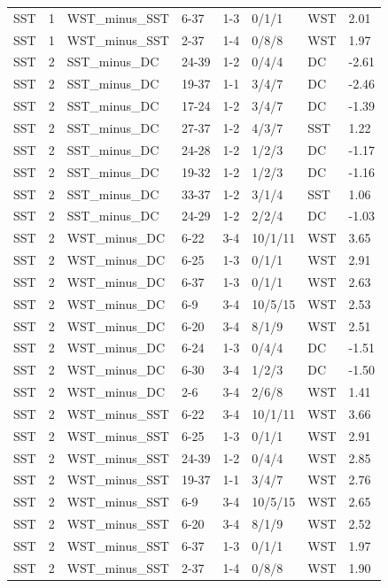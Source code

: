 \begin{table}[!h]
\begin{tabular}[t]{lrllllll}
SST & 1 & WST_minus_SST & 6-37 & 1-3 & 0/1/1 & WST & 2.01\\
SST & 1 & WST_minus_SST & 2-37 & 1-4 & 0/8/8 & WST & 1.97\\
SST & 2 & SST_minus_DC & 24-39 & 1-2 & 0/4/4 & DC & -2.61\\
\addlinespace
SST & 2 & SST_minus_DC & 19-37 & 1-1 & 3/4/7 & DC & -2.46\\
SST & 2 & SST_minus_DC & 17-24 & 1-2 & 3/4/7 & DC & -1.39\\
SST & 2 & SST_minus_DC & 27-37 & 1-2 & 4/3/7 & SST & 1.22\\
SST & 2 & SST_minus_DC & 24-28 & 1-2 & 1/2/3 & DC & -1.17\\
SST & 2 & SST_minus_DC & 19-32 & 1-2 & 1/2/3 & DC & -1.16\\
\addlinespace
SST & 2 & SST_minus_DC & 33-37 & 1-2 & 3/1/4 & SST & 1.06\\
SST & 2 & SST_minus_DC & 24-29 & 1-2 & 2/2/4 & DC & -1.03\\
SST & 2 & WST_minus_DC & 6-22 & 3-4 & 10/1/11 & WST & 3.65\\
SST & 2 & WST_minus_DC & 6-25 & 1-3 & 0/1/1 & WST & 2.91\\
SST & 2 & WST_minus_DC & 6-37 & 1-3 & 0/1/1 & WST & 2.63\\
\addlinespace
SST & 2 & WST_minus_DC & 6-9 & 3-4 & 10/5/15 & WST & 2.53\\
SST & 2 & WST_minus_DC & 6-20 & 3-4 & 8/1/9 & WST & 2.51\\
SST & 2 & WST_minus_DC & 6-24 & 1-3 & 0/4/4 & DC & -1.51\\
SST & 2 & WST_minus_DC & 6-30 & 3-4 & 1/2/3 & DC & -1.50\\
SST & 2 & WST_minus_DC & 2-6 & 3-4 & 2/6/8 & WST & 1.41\\
\addlinespace
SST & 2 & WST_minus_SST & 6-22 & 3-4 & 10/1/11 & WST & 3.66\\
SST & 2 & WST_minus_SST & 6-25 & 1-3 & 0/1/1 & WST & 2.91\\
SST & 2 & WST_minus_SST & 24-39 & 1-2 & 0/4/4 & WST & 2.85\\
SST & 2 & WST_minus_SST & 19-37 & 1-1 & 3/4/7 & WST & 2.76\\
SST & 2 & WST_minus_SST & 6-9 & 3-4 & 10/5/15 & WST & 2.65\\
\addlinespace
SST & 2 & WST_minus_SST & 6-20 & 3-4 & 8/1/9 & WST & 2.52\\
SST & 2 & WST_minus_SST & 6-37 & 1-3 & 0/1/1 & WST & 1.97\\
SST & 2 & WST_minus_SST & 2-37 & 1-4 & 0/8/8 & WST & 1.90\\
\bottomrule
\end{tabular}
\end{table}

